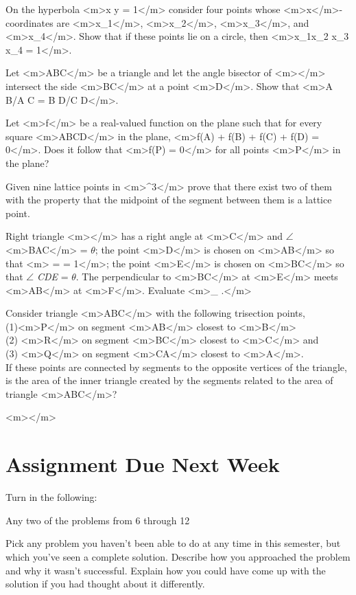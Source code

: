 On the hyperbola <m>x y = 1</m> consider four points whose <m>x</m>-coordinates are <m>x_1</m>, <m>x_2</m>, <m>x_3</m>, and <m>x_4</m>. { }Show that if these points
lie on a circle, then <m>x_1\cdot  x_{2 }\cdot x_{3 }\cdot x_4 = 1</m>.

Let <m>ABC</m> be a triangle and let the angle bisector of <m></m> intersect the side <m>BC</m> at a point <m>D</m>. Show
that <m>A B/A C = B D/C D</m>.

Let <m>f</m> be a real-valued function on the plane such that for every square <m>ABCD</m> in the plane, <m>f(A) + f(B) + f(C) + f(D) = 0</m>.
Does it follow that <m>f(P) = 0</m> for all points <m>P</m> in the plane?

Given nine lattice points in <m>^3</m> prove that there exist two of them with the property that the midpoint of the segment between them
is a lattice point.

Right triangle <m></m> has a right angle at <m>C</m> and $\angle $<m>BAC</m> = $\theta $; the point <m>D</m> is chosen on <m>AB</m>
so that <m> = \text{\textit{$ $}}= 1</m>; the point <m>E</m> is chosen on <m>BC</m> so that $\angle $\textit{
CDE} = $\theta $. The perpendicular to <m>BC</m> at <m>E</m> meets <m>AB</m> at <m>F</m>. Evaluate { } <m>\lim _{\theta {}} .</m>

Consider triangle <m>ABC</m> with the following trisection points,\\
(1)<m>P</m> on segment <m>AB</m> closest to <m>B</m>\\
(2) <m>R</m> on segment <m>BC</m> closest to <m>C</m> and\\
(3) <m>Q</m> on segment <m>CA</m> closest to <m>A</m>.\\
If these points are connected by segments to the opposite vertices of the triangle, is the area of the inner triangle created by the segments related
to the area of triangle <m>ABC</m>?



<m></m>


\section{Assignment Due Next Week}



Turn in the following:


\item Any two of the problems from 6 through 12


\item Pick any problem you haven{'}t been able to do at any time in this semester, but which you{'}ve seen a complete solution. { } Describe how
you approached the problem and why it wasn{'}t successful. { } Explain how you could have come up with the solution if you had thought about it differently.






